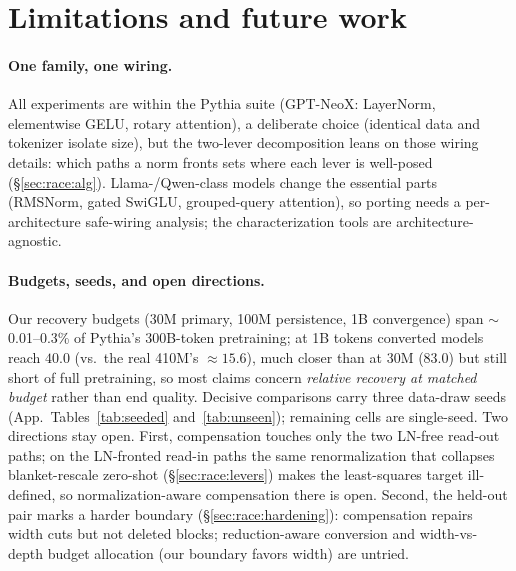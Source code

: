 \section{Limitations and future work}
\label{sec:limitations}

\paragraph{One family, one wiring.}
All experiments are within the Pythia suite (GPT-NeoX: LayerNorm, elementwise
GELU, rotary attention), a deliberate choice (identical data and tokenizer isolate
size), but the two-lever decomposition leans on those wiring details: which paths
a norm fronts sets where each lever is well-posed (\S\ref{sec:race:alg}).
Llama-/Qwen-class models change the essential parts (RMSNorm, gated SwiGLU,
grouped-query attention), so porting needs a per-architecture safe-wiring
analysis; the characterization tools are architecture-agnostic.

\paragraph{Budgets, seeds, and open directions.}
Our recovery budgets (30M primary, 100M persistence, 1B convergence) span
$\sim$0.01--0.3\% of Pythia's 300B-token pretraining; at 1B tokens converted
models reach $40.0$ (vs.\ the real 410M's $\approx15.6$), much closer than at
30M ($83.0$) but still short of full pretraining, so most claims concern
\emph{relative recovery at matched budget} rather than end quality. Decisive
comparisons carry three data-draw seeds (App.~Tables~\ref{tab:seeded}
and~\ref{tab:unseen}); remaining cells are single-seed. Two directions stay open.
First, compensation touches only the two LN-free read-out paths; on the LN-fronted
read-in paths the same renormalization that collapses blanket-rescale zero-shot
(\S\ref{sec:race:levers}) makes the least-squares target ill-defined, so
normalization-aware compensation there is open. Second, the held-out pair marks a
harder boundary (\S\ref{sec:race:hardening}): compensation repairs width cuts but
not deleted blocks; reduction-aware conversion and width-vs-depth budget
allocation (our boundary favors width) are untried.

